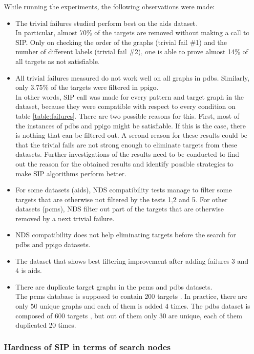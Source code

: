 \documentclass{l4proj}
\begin{document}
While running the experiments, the following observations were made:
\begin{itemize}
\item The trivial failures studied perform best on the aids dataset.\\
In particular, almost 70\% of the targets are removed without making a call to SIP. Only on checking the order of the graphs (trivial fail \#1) and the number of different labels (trivial fail \#2), one is able to prove almost 14\% of all targets as not satisfiable.   
\item All trivial failures measured do not work well on all graphs in pdbs. Similarly, only 3.75\% of the targets were filtered in ppigo.\\
In other words, SIP call was made for every pattern and target graph in the dataset, because they were compatible with respect to every condition on table \ref{table:failures}. There are two possible reasons for this. First, most of the instances of pdbs and ppigo might be satisfiable. If this is the case, there is nothing that can be filtered out. A second reason for these results could be that the trivial fails are not strong enough to eliminate targets from these datasets. Further investigations of the results need to be conducted to find out the reason for the obtained results and identify possible strategies to make SIP algorithms perform better.
\item For some datasets (aids), NDS compatibility tests manage to filter some targets that are otherwise not filtered by the tests 1,2 and 5. For other datasets (pcms), NDS filter out part of the targets that are otherwise removed by a next trivial failure.
\item NDS compatibility does not help eliminating targets before the search for pdbs and ppigo datasets.
\item The dataset that shows best filtering improvement after adding failures 3 and 4 is aids.
\item There are duplicate target graphs in the pcms and pdbs datasets.\\
The pcms database is supposed to contain 200 targets \cite{datasets}. In practice, there are only 50 unique graphs and each of them is added 4 times. The pdbs dataset is composed of 600 targets \cite{datasets}, but out of them only 30 are unique, each of them duplicated 20 times.
\end{itemize}

\subsubsection{Hardness of SIP in terms of search nodes}
\end{document}
